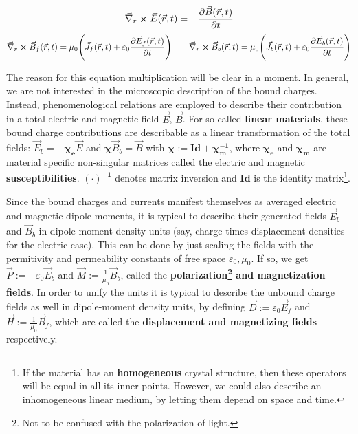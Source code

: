 \documentclass[11pt, a4paper, twoside]{article} %
\begin{document}
\begin{equation}\label{curlBt}
\vec{\nabla }_r\cross \vec{E}(\vec{r},t)=-\pdv{\vec{B}(\vec{r},t)}{t} 
\end{equation}
\begin{equation}
\vec{\nabla }_r\cross \vec{B}_f(\vec{r},t)=\mu_0\qty(\vec{J}_f(\vec{r},t)+\varepsilon_0\pdv{\vec{E}_f(\vec{r},t)}{t})\quad \quad  \vec{\nabla }_r\cross \vec{B}_b(\vec{r},t)=\mu_0\qty(\vec{J}_b(\vec{r},t)+\varepsilon_0\pdv{\vec{E}_b(\vec{r},t)}{t})
\end{equation}

The reason for this equation multiplication will be clear in a moment. In general, we are not interested in the microscopic description of the bound charges. Instead, phenomenological relations are employed to describe their contribution in a total electric and magnetic field $\vec{E}$, $\vec{B}$. For so called {\bf linear materials}, these bound charge contributions are describable as a linear transformation of the total fields: $\vec{E}_b=-\pmb{\chi_e} \vec{E}$ and $\pmb{\chi}\vec{B}_b= \vec{B}$ with $\pmb{\chi}:=\pmb{Id}+\pmb{\chi_m^{-1}}$, where $\pmb{\chi_e}$ and $\pmb{\chi_m}$ are material specific non-singular matrices called the electric and magnetic {\bf susceptibilities}. $\pmb{(\cdot)^{-1}}$ denotes matrix inversion and $\pmb{Id}$ is the identity matrix\footnote{If the material has an {\bf homogeneous} crystal structure, then these operators will be equal in all its inner points. However, we could also describe an inhomogeneous linear medium, by letting them depend on space and time. }. 

Since the bound charges and currents manifest themselves as averaged electric and magnetic dipole moments, it is typical to describe their generated fields $\vec{E}_b$ and $\vec{B}_b$ in dipole-moment density units (say, charge times displacement densities for the electric case). This can be done by just scaling the fields with the permitivity and permeability constants of free space $\varepsilon_0,\mu_0$. If so, we get $\vec{P}:=-\varepsilon_0\vec{E}_b$ and $\vec{M}:=\frac{1}{\mu_0}\vec{B}_b$, called the {\bf polarization\footnote{Not to be confused with the polarization of light.} and magnetization fields}. In order to unify the units it is typical to describe the unbound charge fields as well in dipole-moment density units, by defining $\vec{D}:=\varepsilon_0\vec{E}_f$ and $\vec{H}:=\frac{1}{\mu_0}\vec{B}_f$, which are called the {\bf displacement and magnetizing fields} respectively.
\end{document}
